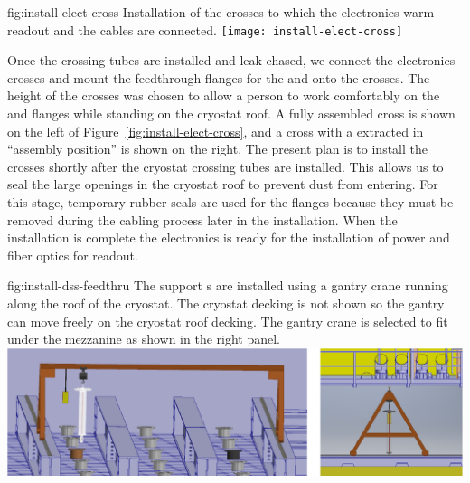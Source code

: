 \begin{dunefigure}{fig:install-elect-cross}
  {Installation of the crosses to which the  electronics warm readout and the  cables are connected.}
 \texttt{[image: install-elect-cross]}
\end{dunefigure}



Once the crossing tubes are installed and leak-chased, 
we connect the   electronics crosses and mount  the feedthrough flanges for the  and  onto the crosses. 
The height of the crosses was chosen to allow a person to work comfortably on the   and  flanges while standing on the cryostat roof. 
A fully assembled cross is shown on the left of Figure~\ref{fig:install-elect-cross}, and a cross with a  extracted in ``assembly position'' is shown on the right. 
The present plan is to install the crosses shortly after the cryostat crossing tubes are installed. 
This allows us to seal the large openings in the cryostat roof to prevent dust from entering.
For this stage, temporary rubber seals are used for the flanges because they must be removed during the cabling process later in the installation. 
When the  installation is complete the  electronics is ready for the installation of power and fiber optics for readout. 

\begin{dunefigure}{fig:install-dss-feedthru}
  {The  support \fdth{}s  are installed using a gantry crane running along the roof of the cryostat. The cryostat decking is not shown 
  so the gantry can move freely on the cryostat roof decking.  The gantry crane is selected to fit under the mezzanine as shown in the right panel.}
  \includegraphics[width=.98\textwidth]{graphics/install-dss-feedthru-v2.pdf}
\end{dunefigure}


